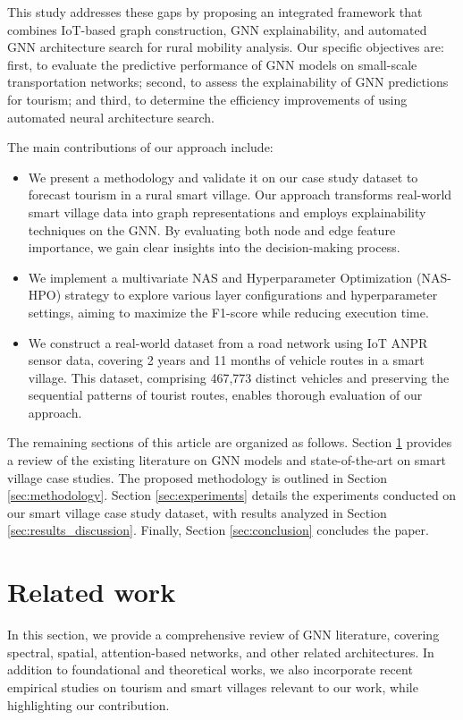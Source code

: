 \documentclass[journal]{IEEEtran}
\begin{document}
This study addresses these gaps by proposing an integrated framework that combines IoT-based graph construction, GNN explainability, and automated GNN architecture search for rural mobility analysis. Our specific objectives are: first, to evaluate the predictive performance of GNN models on small-scale transportation networks; second, to assess the explainability of GNN predictions for tourism; and third, to determine the efficiency improvements of using automated neural architecture search.


The main contributions of our approach include:
\begin{itemize}
    \item We present a methodology and validate it on our case study dataset to forecast tourism in a rural smart village. Our approach transforms real-world smart village data into graph representations and employs explainability techniques on the GNN. By evaluating both node and edge feature importance, we gain clear insights into the decision-making process.
    \item We implement a multivariate NAS and Hyperparameter Optimization (NAS-HPO) strategy to explore various layer configurations and hyperparameter settings, aiming to maximize the F1-score while reducing execution time.
    \item We construct a real-world dataset from a road network using IoT ANPR sensor data, covering 2 years and 11 months of vehicle routes in a smart village. This dataset, comprising 467,773 distinct vehicles and preserving the sequential patterns of tourist routes, enables thorough evaluation of our approach.
\end{itemize}


The remaining sections of this article are organized as follows. Section \ref{sec:related_work} provides a review of the existing literature on GNN models and state-of-the-art on smart village case studies. The proposed methodology is outlined in Section \ref{sec:methodology}. Section \ref{sec:experiments} details the experiments conducted on our smart village case study dataset, with results analyzed in Section \ref{sec:results_discussion}. Finally, Section \ref{sec:conclusion} concludes the paper.

\section{Related work} \label{sec:related_work}


In this section, we provide a comprehensive review of GNN literature, covering spectral, spatial, attention-based networks, and other related architectures. In addition to foundational and theoretical works, we also incorporate recent empirical studies on tourism and smart villages relevant to our work, while highlighting our contribution.
\end{document}

